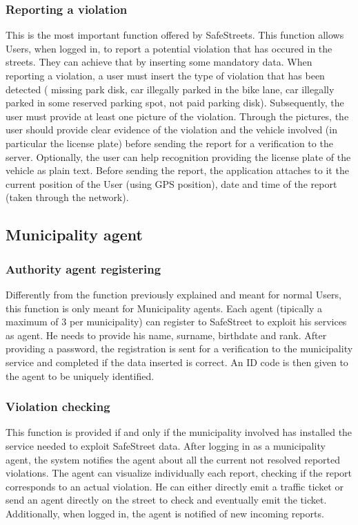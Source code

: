 \documentclass[a4paper]{report}
\begin{document}
\subsubsection{Reporting a violation}
This is the most important function offered by SafeStreets. This function allows Users, when logged in, to report a potential violation that has occured in the streets. 
They can achieve that by inserting some mandatory data. When reporting a violation, a user must insert the type of violation that has been detected ( missing park disk, car illegally parked in the bike lane, car illegally parked in some reserved parking spot, not paid parking disk).
Subsequently, the user must provide at least one picture of the violation. Through the pictures, the user should provide clear evidence of the violation and the vehicle involved (in particular the license plate) before sending the report for a verification to the server. Optionally, the user can help recognition providing the license plate of the vehicle as plain text. Before sending the report, the application attaches to it the current position of the User (using GPS position), date and time of the report (taken through the network).

\subsection{Municipality agent}
\subsubsection{Authority agent registering}
Differently from the function previously explained and meant for normal Users, this function is only meant for Municipality agents. Each agent (tipically a maximum of 3 per municipality) can register to SafeStreet to exploit his services as agent. He needs to provide his name, surname, birthdate and rank. After providing a password, the registration is sent for a verification to the municipality service and completed if the data inserted is correct. An ID code is then given to the agent to be uniquely identified.

\subsubsection{Violation checking}

This function is provided if and only if the municipality involved has installed the service needed to exploit SafeStreet data. After logging in as a municipality agent, the system notifies the agent about all the current not resolved reported violations. The agent can visualize individually each report, checking if the report corresponds to an actual violation. He can  either directly emit a traffic ticket or send an agent directly on the street to check and eventually emit the ticket.
Additionally, when logged in, the agent is notified of new incoming reports.
\end{document}
